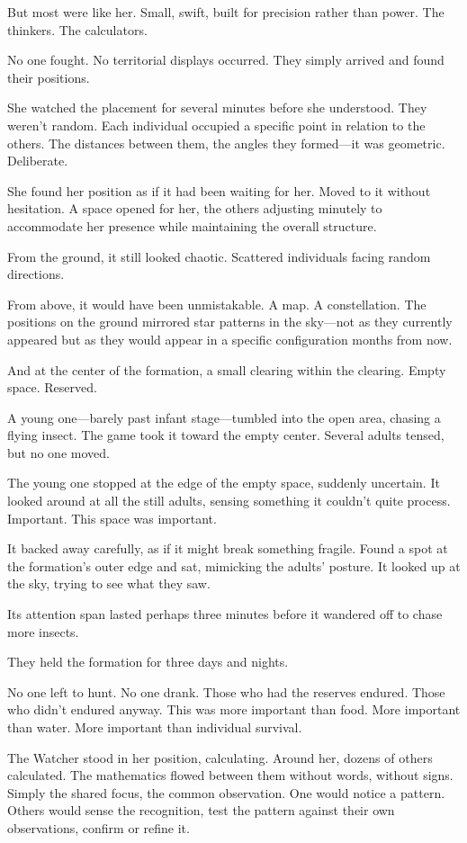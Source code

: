 But most were like her. Small, swift, built for precision rather than power. The thinkers. The calculators.

No one fought. No territorial displays occurred. They simply arrived and found their positions.

She watched the placement for several minutes before she understood. They weren't random. Each individual occupied a specific point in relation to the others. The distances between them, the angles they formed—it was geometric. Deliberate.

She found her position as if it had been waiting for her. Moved to it without hesitation. A space opened for her, the others adjusting minutely to accommodate her presence while maintaining the overall structure.

From the ground, it still looked chaotic. Scattered individuals facing random directions.

From above, it would have been unmistakable. A map. A constellation. The positions on the ground mirrored star patterns in the sky—not as they currently appeared but as they would appear in a specific configuration months from now.

And at the center of the formation, a small clearing within the clearing. Empty space. Reserved.

A young one—barely past infant stage—tumbled into the open area, chasing a flying insect. The game took it toward the empty center. Several adults tensed, but no one moved.

The young one stopped at the edge of the empty space, suddenly uncertain. It looked around at all the still adults, sensing something it couldn't quite process. Important. This space was important.

It backed away carefully, as if it might break something fragile. Found a spot at the formation's outer edge and sat, mimicking the adults' posture. It looked up at the sky, trying to see what they saw.

Its attention span lasted perhaps three minutes before it wandered off to chase more insects.

\scenebreak

They held the formation for three days and nights.

No one left to hunt. No one drank. Those who had the reserves endured. Those who didn't endured anyway. This was more important than food. More important than water. More important than individual survival.

The Watcher stood in her position, calculating. Around her, dozens of others calculated. The mathematics flowed between them without words, without signs. Simply the shared focus, the common observation. One would notice a pattern. Others would sense the recognition, test the pattern against their own observations, confirm or refine it.


